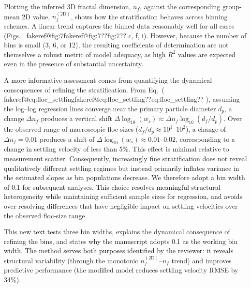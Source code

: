 \documentclass[11pt]{article}
\makeatletter
\newenvironment{Snippet}{%
  \par\vspace{0.3em}\begin{list}{}{\setlength{\leftmargin}{1em}\setlength{\rightmargin}{0.5em}}\item\small\itshape
}{%
  \end{list}\vspace{0.3em}
}
\newcommand{\fakeref}[1]{%
  \ifcsname fakeref@#1\endcsname\csname fakeref@#1\endcsname\else ??#1??\fi
}
\renewcommand{\ref}[1]{\fakeref{#1}}%
\renewcommand{\eqref}[1]{(\fakeref{#1})}%
\makeatother
\begin{document}
\begin{enumerate}[label=\textbf{R3.\arabic*.}]
\begin{Snippet}
Plotting the inferred 3D fractal dimension, $n_f$, against the corresponding group-mean 2D value, $n_f^{(\mathrm{2D})}$, shows how the stratification behaves across binning schemes. A linear trend captures the binned data reasonably well for all cases (Figs.~\ref{fig:7}c, f, i). However, because the number of bins is small (3, 6, or 12), the resulting coefficients of determination are not themselves a robust metric of model adequacy, as high $R^2$ values are expected even in the presence of substantial uncertainty.

A more informative assessment comes from quantifying the dynamical consequences of refining the stratification. From Eq.~\eqref{eq:floc_settling}, assuming the log--log regression lines converge near the primary particle diameter $d_p$, a change $\Delta n_f$ produces a vertical shift $\Delta \log_{10}(w_s) \approx \Delta n_f \log_{10}(d_f/d_p)$. Over the observed range of macroscopic floc sizes ($d_f/d_p \approx 10^1$--$10^2$), a change of $\Delta n_f = 0.01$ produces a shift of $\Delta \log_{10}(w_s) \approx 0.01$--$0.02$, corresponding to a change in settling velocity of less than 5\%. This effect is minimal relative to measurement scatter. Consequently, increasingly fine stratification does not reveal qualitatively different settling regimes but instead primarily inflates variance in the estimated slopes as bin populations decrease. We therefore adopt a bin width of 0.1 for subsequent analyses. This choice resolves meaningful structural heterogeneity while maintaining sufficient sample sizes for regression, and avoids over-resolving differences that have negligible impact on settling velocities over the observed floc-size range.
\end{Snippet}
This new text tests three bin widths, explains the dynamical consequence of refining the bins, and states why the manuscript adopts 0.1 as the working bin width. The method serves both purposes identified by the reviewer: it reveals structural variability (through the monotonic $n_f^{(\mathrm{2D})}$--$n_f$ trend) and improves predictive performance (the modified model reduces settling velocity RMSE by 34\%).


\end{enumerate}
\end{document}
